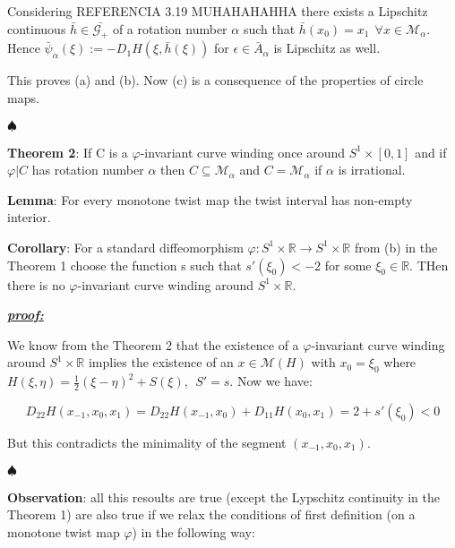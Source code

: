 \documentclass{article}
\begin{document}
\noindent Considering REFERENCIA 3.19 MUHAHAHAHHA there exists a Lipschitz continuous $\bar{h} \in \bar{ \mathcal{G}_{+} }$ of a rotation number $\alpha$ such that $\bar{h} (x_0) = x_1 \ \ \forall x \in \mathcal{M}_{\alpha}$. Hence $\bar{\psi}_{\alpha} (\xi) := - D_{1} H (\xi, \bar{h} ( \xi ) )$ for $\epsilon \in \bar{A}_{\alpha}$ is Lipschitz as well.

\noindent This proves (a) and (b). Now (c) is a consequence of the properties of circle maps.


	\noindent $\spadesuit$
\color{black}
		
		
\noindent \textbf{Theorem 2}: If C is a $\varphi$-invariant curve winding once around $S^{1} \times [0, 1]$ and if $\varphi | C$ has rotation number $\alpha$ then $C \subseteq \mathcal{M}_{\alpha}$ and $C = \mathcal{M}_{\alpha}$ if $\alpha$ is irrational. 
		
		

		
\noindent \textbf{Lemma}: For every monotone twist map the twist interval has non-empty interior.

\noindent \textbf{Corollary}: For a standard diffeomorphism $\varphi: S^{1} \times \mathbb{R} \rightarrow S^{1} \times \mathbb{R}$ from (b) in the Theorem 1 choose the function s such that $s' (\xi_{0}) < -2$ for some $\xi_0 \in \mathbb{R}$. THen there is no $\varphi$-invariant curve winding around $S^1 \times \mathbb{R}$.


\color{blue}
	\noindent \underline{\textbf{\textit{proof:}}} 		

	\noindent We know from the Theorem 2 that the existence of a $\varphi$-invariant curve winding around $S^{1} \times \mathbb{R}$ implies the existence of an $x \in \mathcal{M} (H)$ with $x_0 = \xi_0$ where $H(\xi, \eta) = \frac{1}{2} ( \xi - \eta )^2 + S(\xi), \ \ S' = s$. Now we have:
		
	$$
		D_{22} H (x_{-1}, x_0, x_1 ) = D_{22} H( x_{-1}, x_0 ) + D_{11} H( x_0, x_1 ) = 2 + s' ( \xi_0 ) < 0	
	$$
	
	\noindent But this contradicts the minimality of the segment $(x_{-1}, x_0, x_1)$.
	
	\noindent $\spadesuit$
\color{black}

\noindent \textbf{Observation}: all this resoults are true (except the Lypschitz continuity in the Theorem 1) are also true if we relax the conditions of first definition (on a monotone twist map $\varphi$) in the following way:
\end{document}
